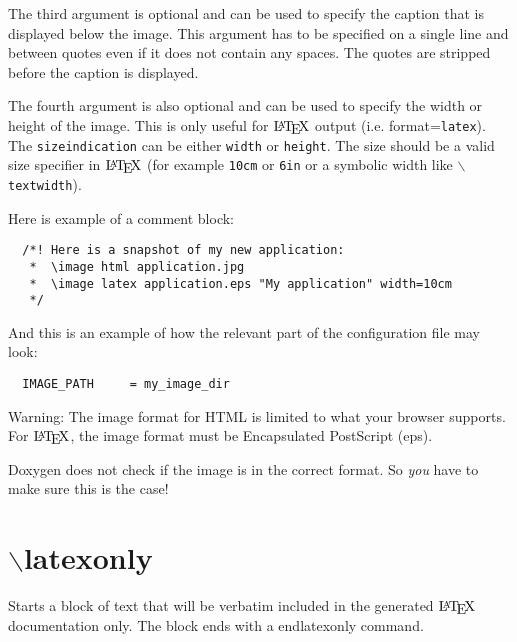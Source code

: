The third argument is optional and can be used to specify the caption that is displayed below the image. This argument has to be specified on a single line and between quotes even if it does not contain any spaces. The quotes are stripped before the caption is displayed.

The fourth argument is also optional and can be used to specify the width or height of the image. This is only useful for $\mbox{\LaTeX}$ output (i.e. format={\tt latex}). The {\tt sizeindication} can be either {\tt width} or {\tt height}. The size should be a valid size specifier in $\mbox{\LaTeX}$ (for example {\tt 10cm} or {\tt 6in} or a symbolic width like {\tt $\backslash$textwidth}).

Here is example of a comment block:



\footnotesize\begin{verbatim}
  /*! Here is a snapshot of my new application:
   *  \image html application.jpg
   *  \image latex application.eps "My application" width=10cm
   */
\end{verbatim}
\normalsize


And this is an example of how the relevant part of the configuration file may look:



\footnotesize\begin{verbatim}
  IMAGE_PATH     = my_image_dir
\end{verbatim}
\normalsize


\begin{Desc}
\item[Warning:]The image format for HTML is limited to what your browser supports. For $\mbox{\LaTeX}$, the image format must be Encapsulated PostScript (eps). \par
\par
 Doxygen does not check if the image is in the correct format. So {\em you\/} have to make sure this is the case!\end{Desc}


 \hypertarget{commands_cmdlatexonly}{}\section{$\backslash$latexonly}\label{commands_cmdlatexonly}
 Starts a block of text that will be verbatim included in the generated $\mbox{\LaTeX}$ documentation only. The block ends with a endlatexonly command.

